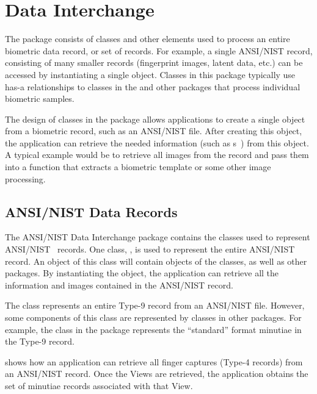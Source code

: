 %
%
\chapter{Data Interchange}
\label{chp-datainterchange}
The  package consists of classes and other elements
used to
process an entire biometric data record, or set of records. For example,
a single ANSI/NIST 
record, consisting of many smaller records (fingerprint images, latent data,
etc.) can be accessed by instantiating a single object. Classes in this
package typically use has-a relationships to classes in the 
and other packages that process individual biometric samples.

The design of classes in the  package allows
applications to
create a single object from a biometric record, such as an ANSI/NIST file.
After creating this object, the application can retrieve the needed information
(such as  s~) from this object.
A typical example would be to retrieve all
images from the record and pass them into a function that extracts a biometric
template or some other image processing.

\section{ANSI/NIST Data Records}
\label{sec-ansinistdatarecords}

The ANSI/NIST Data Interchange package contains the classes used to represent
ANSI/NIST~\cite{std:an2k} records. One class, ,
is used to represent the entire ANSI/NIST record. An object of this class
will contain objects of the  classes, as well as other packages.
By instantiating the  object, the application can retrieve all
the information and images contained in the ANSI/NIST record.

The  class represents an entire Type-9 record
from an ANSI/NIST file. However, some components of this class are represented 
by classes in other packages. For example, the  class in
the 
package represents the ``standard'' format minutiae in the Type-9 record.

 shows how an application can retrieve all finger
captures (Type-4 records) from an ANSI/NIST record. Once the Views are
retrieved, the application obtains the set of minutiae records associated with
that View.

